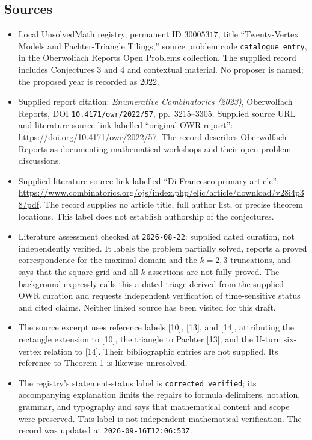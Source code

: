 \documentclass[11pt]{article}
\begin{document}
\subsection{Sources}
\begin{itemize}
\item Local UnsolvedMath registry, permanent ID \(30005317\), title ``Twenty-Vertex Models and Pachter-Triangle Tilings,'' source problem code \texttt{catalogue entry}, in the Oberwolfach Reports Open Problems collection. The supplied record includes Conjectures 3 and 4 and contextual material. No proposer is named; the proposed year is recorded as 2022.
\item Supplied report citation: \emph{Enumerative Combinatorics (2023)}, Oberwolfach Reports, DOI \texttt{10.4171/owr/2022/57}, pp.\ 3215--3305. Supplied source URL and literature-source link labelled ``original OWR report'': \url{https://doi.org/10.4171/owr/2022/57}. The record describes Oberwolfach Reports as documenting mathematical workshops and their open-problem discussions.
\item Supplied literature-source link labelled ``Di Francesco primary article'': \url{https://www.combinatorics.org/ojs/index.php/eljc/article/download/v28i4p38/pdf}. The record supplies no article title, full author list, or precise theorem locations. This label does not establish authorship of the conjectures.
\item Literature assessment checked at \texttt{2026-08-22}: supplied dated curation, not independently verified. It labels the problem partially solved, reports a proved correspondence for the maximal domain and the \(k=2,3\) truncations, and says that the square-grid and all-\(k\) assertions are not fully proved. The background expressly calls this a dated triage derived from the supplied OWR curation and requests independent verification of time-sensitive status and cited claims. Neither linked source has been visited for this draft.
\item The source excerpt uses reference labels [10], [13], and [14], attributing the rectangle extension to [10], the triangle to Pachter [13], and the U-turn six-vertex relation to [14]. Their bibliographic entries are not supplied. Its reference to Theorem 1 is likewise unresolved.
\item The registry's statement-status label is \texttt{corrected\_verified}; its accompanying explanation limits the repairs to formula delimiters, notation, grammar, and typography and says that mathematical content and scope were preserved. This label is not independent mathematical verification. The record was updated at \texttt{2026-09-16T12:06:53Z}.
\end{itemize}
\end{document}
